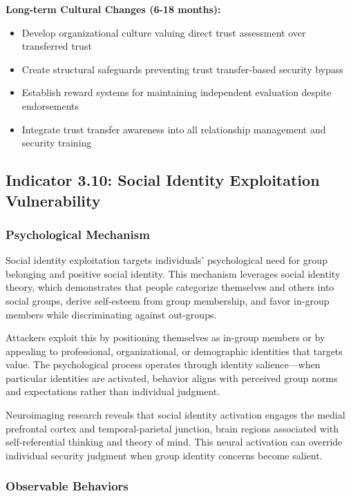 \documentclass[11pt,a4paper]{article}
\begin{document}
\textbf{Long-term Cultural Changes (6-18 months):}
\begin{itemize}
\item Develop organizational culture valuing direct trust assessment over transferred trust
\item Create structural safeguards preventing trust transfer-based security bypass
\item Establish reward systems for maintaining independent evaluation despite endorsements
\item Integrate trust transfer awareness into all relationship management and security training
\end{itemize}

\subsection{Indicator 3.10: Social Identity Exploitation Vulnerability}

\subsubsection{Psychological Mechanism}

Social identity exploitation targets individuals' psychological need for group belonging and positive social identity. This mechanism leverages social identity theory\cite{tajfel1979}, which demonstrates that people categorize themselves and others into social groups, derive self-esteem from group membership, and favor in-group members while discriminating against out-groups.

Attackers exploit this by positioning themselves as in-group members or by appealing to professional, organizational, or demographic identities that targets value. The psychological process operates through identity salience—when particular identities are activated, behavior aligns with perceived group norms and expectations rather than individual judgment\cite{hogg2001}.

Neuroimaging research reveals that social identity activation engages the medial prefrontal cortex and temporal-parietal junction, brain regions associated with self-referential thinking and theory of mind\cite{mitchell2008}. This neural activation can override individual security judgment when group identity concerns become salient.

\subsubsection{Observable Behaviors}
\end{document}
